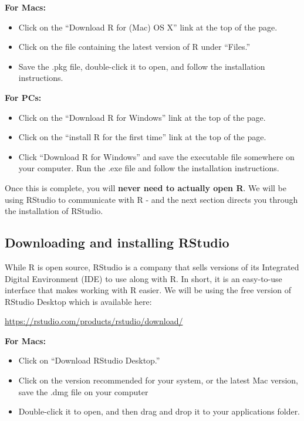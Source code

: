 \documentclass[
]{book}
\begin{document}
\textbf{For Macs:}

\begin{itemize}
\item
  Click on the ``Download R for (Mac) OS X'' link at the top of the page.
\item
  Click on the file containing the latest version of R under ``Files.''
\item
  Save the .pkg file, double-click it to open, and follow the installation instructions.
\end{itemize}

\textbf{For PCs:}

\begin{itemize}
\item
  Click on the ``Download R for Windows'' link at the top of the page.
\item
  Click on the ``install R for the first time'' link at the top of the page.
\item
  Click ``Download R for Windows'' and save the executable file somewhere on your computer. Run the .exe file and follow the installation instructions.
\end{itemize}

Once this is complete, you will \textbf{never need to actually open R}. We will be using RStudio to communicate with R - and the next section directs you through the installation of RStudio.

\subsection{Downloading and installing RStudio}\label{downloading-and-installing-rstudio}

While R is open source, RStudio is a company that sells versions of its Integrated Digital Environment (IDE) to use along with R. In short, it is an easy-to-use interface that makes working with R easier. We will be using the free version of RStudio Desktop which is available here:

\url{https://rstudio.com/products/rstudio/download/}

\textbf{For Macs:}

\begin{itemize}
\item
  Click on ``Download RStudio Desktop.''
\item
  Click on the version recommended for your system, or the latest Mac version, save the .dmg file on your computer
\item
  Double-click it to open, and then drag and drop it to your applications folder.
\end{itemize}
\end{document}
